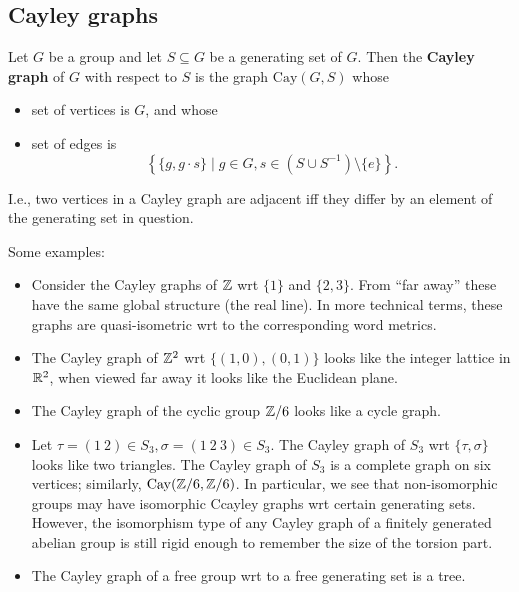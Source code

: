 \subsection{Cayley graphs}
\begin{definition}[]
    Let $G$ be a group and let $S \subseteq G$ be a generating set of $G$. Then the \textbf{Cayley graph} of $G$ with respect to $S$ is the graph $\mathrm{Cay}(G,S)$ whose 
    \begin{itemize}
    \setlength\itemsep{-.2em}
        \item set of vertices is $G$, and whose
        \item set of edges is \[
                \left\{\{g, g\cdot s\} \mid g \in G, s \in (S \cup S^{-1}) \setminus \{e\} \right\} .
        \] 
    \end{itemize}I.e., two vertices in a Cayley graph are adjacent iff they differ by an element of the generating set in question.
\end{definition}
\begin{example}
    Some examples:
    \begin{itemize}
    \setlength\itemsep{-.2em}
        \item Consider the Cayley graphs of $\mathbb{Z}$ wrt $\{1\} $ and $\{2,3\} $. From ``far away'' these have the same global structure (the real line). In more technical terms, these graphs are quasi-isometric wrt to the corresponding word metrics. 
        \item The Cayley graph of $\mathbb{Z}^2$ wrt $\{(1,0), (0,1)\} $ looks like the integer lattice in $\mathbb{R}^2$, when viewed far away it looks like the Euclidean plane.
        \item The Cayley graph of the cyclic group $\mathbb{Z} /6$ looks like a cycle graph.
        \item Let $\tau = (1\ 2) \in S_3, \sigma = (1\ 2\ 3) \in S_3$. The Cayley graph of $S_3$ wrt $\{\tau, \sigma\} $ looks like two triangles. The Cayley graph of $S_3$ is a complete graph on six vertices; similarly, $\mathrm{Cay}(\mathbb{Z} /6, \mathbb{Z} /6)$. In particular, we see that non-isomorphic groups may have isomorphic Ccayley graphs wrt certain generating sets. However, the isomorphism type of any Cayley graph of a finitely generated abelian group is still rigid enough to remember the size of the torsion part.
        \item The Cayley graph of a free group wrt to a free generating set is a tree.
    \end{itemize}
\end{example}
